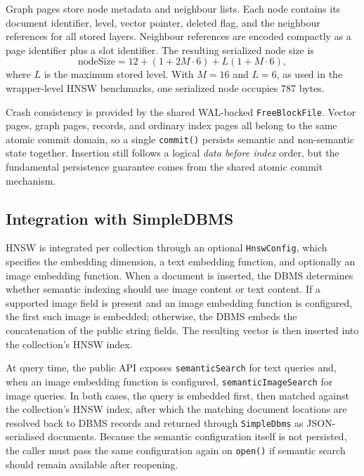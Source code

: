 \medskip
\noindent
Graph pages store node metadata and neighbour lists. Each node contains its document identifier, level, vector pointer, deleted flag, and the neighbour references for all stored layers. Neighbour references are encoded compactly as a page identifier plus a slot identifier. The resulting serialized node size is
$$
\text{nodeSize} = 12 + (1 + 2M \cdot 6) + L(1 + M \cdot 6),
$$
where $L$ is the maximum stored level. With $M = 16$ and $L = 6$, as used in the wrapper-level HNSW benchmarks, one serialized node occupies 787 bytes.

\medskip
\noindent
Crash consistency is provided by the shared WAL-backed \texttt{FreeBlockFile}. Vector pages, graph pages, records, and ordinary index pages all belong to the same atomic commit domain, so a single \texttt{commit()} persists semantic and non-semantic state together. Insertion still follows a logical \emph{data before index} order, but the fundamental persistence guarantee comes from the shared atomic commit mechanism.

\subsection{Integration with SimpleDBMS}
HNSW is integrated per collection through an optional \texttt{HnswConfig}, which specifies the embedding dimension, a text embedding function, and optionally an image embedding function. When a document is inserted, the DBMS determines whether semantic indexing should use image content or text content. If a supported image field is present and an image embedding function is configured, the first such image is embedded; otherwise, the DBMS embeds the concatenation of the public string fields. The resulting vector is then inserted into the collection's HNSW index.

\medskip
\noindent
At query time, the public API exposes \texttt{semanticSearch} for text queries and, when an image embedding function is configured, \texttt{semanticImageSearch} for image queries. In both cases, the query is embedded first, then matched against the collection's HNSW index, after which the matching document locations are resolved back to DBMS records and returned through \texttt{SimpleDbms} as JSON-serialised documents. Because the semantic configuration itself is not persisted, the caller must pass the same configuration again on \texttt{open()} if semantic search should remain available after reopening.

